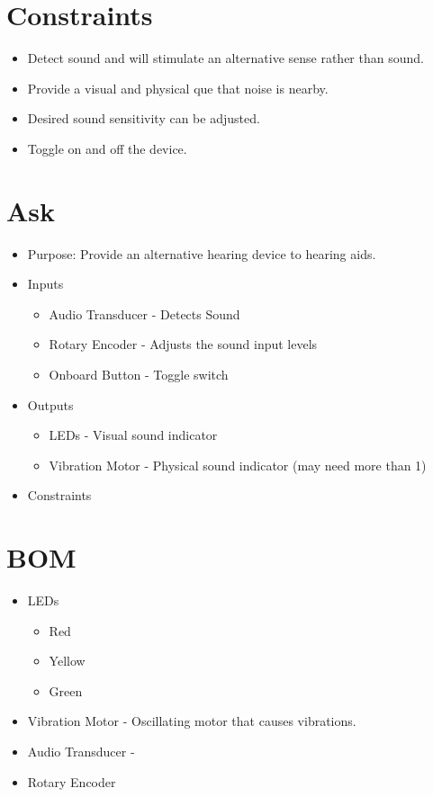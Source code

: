 \documentclass{article}
\begin{document}
\section{Constraints}
\begin{itemize}
    \item Detect sound and will stimulate an alternative sense rather than sound.
    \item Provide a visual and physical que that noise is nearby.
    \item Desired sound sensitivity can be adjusted.
    \item Toggle on and off the device.
  \end{itemize}

\section{Ask}
\begin{itemize}
    \item Purpose:
    \newline
    Provide an alternative hearing device to hearing aids.
    \item Inputs
    \begin{itemize}
        \item Audio Transducer  - Detects Sound
        \item Rotary Encoder - Adjusts the sound input levels
        \item Onboard Button - Toggle switch
    \end{itemize}

    \item Outputs
    \begin{itemize}
        \item LEDs - Visual sound indicator
        \item Vibration Motor - Physical sound indicator (may need more than 1)
    \end{itemize}
    \item Constraints
  \end{itemize}

\section{BOM}
\begin{itemize}
    \item LEDs 
    \begin{itemize}
        \item Red
        \item Yellow
        \item Green
    \end{itemize}
    \item Vibration Motor - Oscillating motor that causes vibrations.
    \item Audio Transducer - 
    \item Rotary Encoder 
  \end{itemize}
\end{document}
